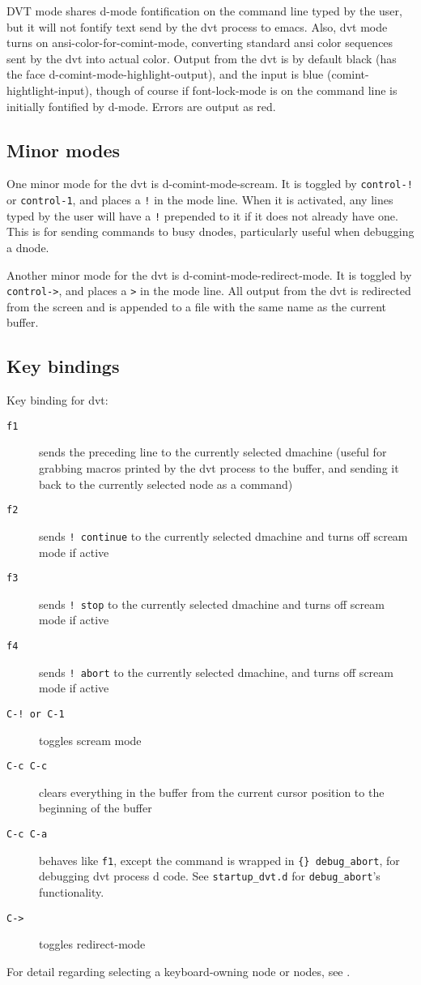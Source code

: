 \documentclass[12pt]{article}
\begin{document}
DVT mode shares d-mode fontification on the command line typed by the
user, but it will not fontify text send by the dvt process to emacs.
Also, dvt mode turns on ansi-color-for-comint-mode, converting
standard ansi color sequences sent by the dvt into actual color.
Output from the dvt is by default black (has the face
d-comint-mode-highlight-output), and the input is blue
(comint-hightlight-input), though of course if font-lock-mode is on
the command line is initially fontified by d-mode.  Errors are output
as red.

\subsection{Minor modes}
  
One minor mode for the dvt is d-comint-mode-scream.  It is toggled by
\verb$control-!$ or \verb$control-1$, and places a \verb$!$ in the
mode line. When it is activated, any lines typed by the user will have
a \verb$!$ prepended to it if it does not already have one.  This is
for sending commands to busy dnodes, particularly useful when
debugging a dnode.
  
Another minor mode for the dvt is d-comint-mode-redirect-mode.  It is
toggled by \verb$control->$, and places a \verb$>$ in the mode line.
All output from the dvt is redirected from the screen and is appended
to a file with the same name as the current buffer.

\subsection{Key bindings}

Key binding for dvt:
\begin{description}   
  \item [\large\tt f1] sends the preceding line to the currently
  selected dmachine (useful for grabbing macros printed by the dvt
  process to the buffer, and sending it back to the currently selected
  node as a command)
  \item [\large\tt f2] sends \verb$! continue$ to the currently
  selected dmachine and turns off scream mode if active
  \item [\large\tt f3] sends \verb$! stop$ to the currently selected
  dmachine and turns off scream mode if active
  \item [\large\tt f4] sends \verb$! abort$ to the currently selected
  dmachine, and turns off scream mode if active
  \item [\tt{\large C-!} {\rm or} {\large C-1}] toggles scream mode
  \item [\large\tt C-c C-c] clears everything in the buffer from the
  current cursor position to the beginning of the buffer
  \item [\large\tt C-c C-a] behaves like \verb$f1$, except the command
  is wrapped in \verb${} debug_abort$, for debugging dvt process d
  code.  See \texttt{startup\_dvt.d} for \verb$debug_abort$'s
  functionality.
  \item [\large\tt C->] toggles redirect-mode 
\end{description}

For detail regarding selecting a keyboard-owning node or nodes, see
\citet{dvt-3.0}.


\end{document}
